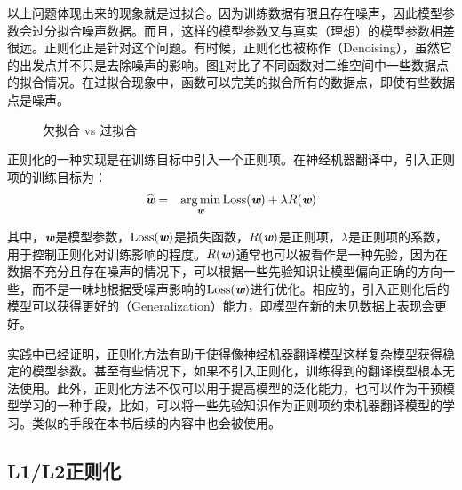 \parinterval 以上问题体现出来的现象就是过拟合。因为训练数据有限且存在噪声，因此模型参数会过分拟合噪声数据。而且，这样的模型参数又与真实（理想）的模型参数相差很远。正则化正是针对这个问题。有时候，正则化也被称作{\small{}}（Denoising），虽然它的出发点并不只是去除噪声的影响。图\ref{fig:13-4}对比了不同函数对二维空间中一些数据点的拟合情况。在过拟合现象中，函数可以完美的拟合所有的数据点，即使有些数据点是噪声。

\begin{figure}[htp]
\centering

\caption{欠拟合 vs 过拟合}
\label{fig:13-4}
\end{figure}

\parinterval 正则化的一种实现是在训练目标中引入一个正则项。在神经机器翻译中，引入正则项的训练目标为：
\begin{eqnarray}
\widehat{\textbf{\em w}} &=& \operatorname*{arg\,min}_{\textbf{\em w}}\textrm{Loss}(\textbf{\em w}) + \lambda R(\textbf{\em w})
\label{eq:13-2}
\end{eqnarray}

\noindent 其中，$\textbf{\em w}$是模型参数，$\textrm{Loss}(\textbf{\em w})$是损失函数，$R(\textbf{\em w})$是正则项，$\lambda$是正则项的系数，用于控制正则化对训练影响的程度。$R(\textbf{\em w})$通常也可以被看作是一种先验，因为在数据不充分且存在噪声的情况下，可以根据一些先验知识让模型偏向正确的方向一些，而不是一味地根据受噪声影响的$\textrm{Loss}(\textbf{\em w})$进行优化。相应的，引入正则化后的模型可以获得更好的{\small{}}（Generalization）能力，即模型在新的未见数据上表现会更好。

\parinterval 实践中已经证明，正则化方法有助于使得像神经机器翻译模型这样复杂模型获得稳定的模型参数。甚至有些情况下，如果不引入正则化，训练得到的翻译模型根本无法使用。此外，正则化方法不仅可以用于提高模型的泛化能力，也可以作为干预模型学习的一种手段，比如，可以将一些先验知识作为正则项约束机器翻译模型的学习。类似的手段在本书后续的内容中也会被使用。


\subsection{L1/L2正则化}

